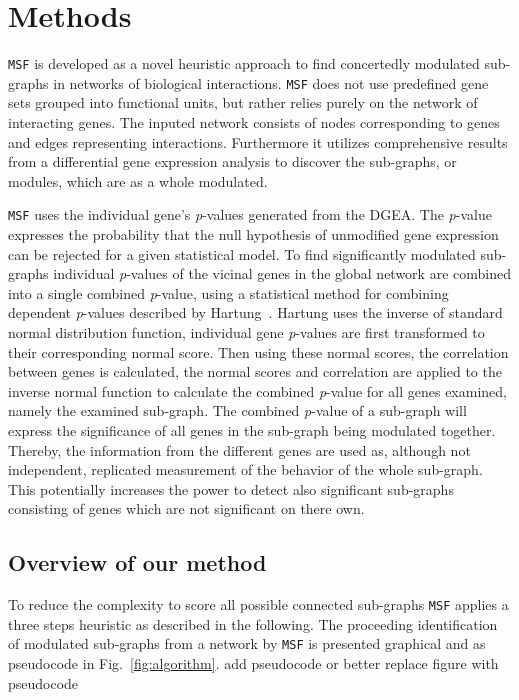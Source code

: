\documentclass[10pt,a4paper,twocolumn]{article}
\newcommand{\TODO}[1]{\begingroup\color{red}#1\endgroup}
\begin{document}
\section*{Methods}
\texttt{MSF} is developed as a novel heuristic approach to
find concertedly modulated sub-graphs in networks of biological interactions.
\texttt{MSF} does not use predefined gene sets grouped into
functional units, but rather relies purely on the network of interacting genes.
The inputed network consists of nodes corresponding to genes and edges
representing interactions. Furthermore it utilizes comprehensive results from a
differential gene expression analysis to discover the sub-graphs, or modules, which
are as a whole modulated.

\texttt{MSF} uses the individual gene's \textit{p}-values generated
from the DGEA. The \textit{p}-value expresses the probability that the
null hypothesis of unmodified gene expression can be rejected for a
given statistical model. To find significantly modulated sub-graphs
individual \textit{p}-values of the vicinal genes in the global
network are combined into a single combined \textit{p}-value, using a
statistical method for combining dependent \textit{p}-values described
by Hartung~\cite{Hartung}. Hartung uses the inverse of standard normal
distribution function, individual gene \textit{p}-values are first
transformed to their corresponding normal score. Then using these
normal scores, the correlation between genes is calculated, the normal
scores and correlation are applied to the inverse normal function to
calculate the combined \textit{p}-value for all genes examined, namely the
examined sub-graph. The combined \textit{p}-value of a sub-graph will
express the significance of all genes in the sub-graph being modulated
together. Thereby, the information from the different genes are used as,
although not independent, replicated measurement of the behavior of the whole
sub-graph. This potentially increases the power to detect also significant
sub-graphs consisting of genes which are not significant on there own.
\newline

\subsection*{Overview of our method}

To reduce the complexity to score all possible connected sub-graphs
\texttt{MSF} applies a three steps heuristic as described in the
following. The proceeding identification of modulated sub-graphs from
a network by \texttt{MSF} is presented graphical and as pseudocode in
Fig.~\ref{fig:algorithm}. \TODO{add pseudocode or better replace figure with pseudocode}
\end{document}
